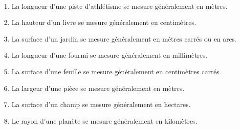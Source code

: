 \begin{colonne*exercice}
\begin{corrige}
\ \\ [-5mm]
   \begin{enumerate}
      \item La longueur d'une piste d'athlétisme se mesure généralement en {\blue mètres}.
      \item La hauteur d'un livre se mesure généralement en {\blue centimètres}.
      \item La surface d'un jardin  se mesure généralement en {\blue mètres carrés} ou en {\blue ares}.
      \item La longueur d'une fourmi se mesure généralement en {\blue millimètres}.
      \item La surface d'une feuille se mesure généralement en {\blue centimètres carrés}.
      \item La largeur d'une pièce se mesure généralement en {\blue mètres}.
      \item La surface d'un champ se mesure généralement en {\blue hectares}.
      \item Le rayon d'une planète se mesure généralement en {\blue kilomètres}.
   \end{enumerate}

\bigskip


\end{corrige}
\end{colonne*exercice}
